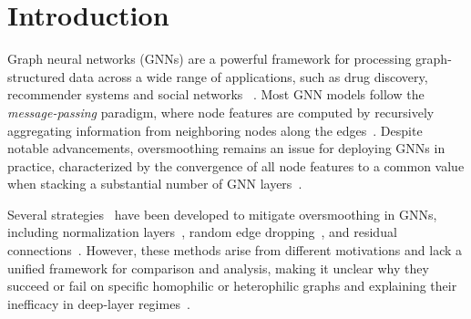 \section{Introduction}
Graph neural networks (GNNs) are a powerful framework for processing graph-structured data across a wide range of applications, such as drug discovery, recommender systems and social networks ~\citep{Gori2005GNN, Scarselli2009TheGN,Bruna2014SpectralNA,Duvenaud2015ConvolutionalNO, Defferrard2016ConvolutionalNN, Battaglia2016Interaction, Li2016Gated}. 
Most GNN models follow the \textit{message-passing} paradigm, where node features are computed by recursively aggregating information from neighboring nodes along the edges~\citep{gcn,sgc,gat,gin}.
Despite notable advancements, oversmoothing remains an issue for deploying
GNNs in practice, characterized by the convergence of all node features to a common value 
when stacking a substantial number of GNN layers~\citep{oversmooth_first, Oono2019GraphNN, Cai2020ANO, wu2023demystifying}.

Several strategies~\citep{LRGNN,Peng2024BeyondOU,signremedy,orderedgnn,ACM-GCN,GRP-GNN} have been developed to mitigate oversmoothing in GNNs, 
including normalization layers~\citep{centernorm,layernorm, contranorm, pairnorm}, random edge dropping~\citep{Fang2022DropMessageUR}, and residual connections~\citep{GCNII,wGCN,appap,dagnn,jknet}. 
However, these methods arise from different motivations and lack a unified framework for comparison and analysis, making it unclear why they succeed or fail on specific homophilic or heterophilic graphs and explaining their inefficacy in deep-layer regimes~\citep{platonov2023critical,sbm_xinyi,ma2021homophily}.

